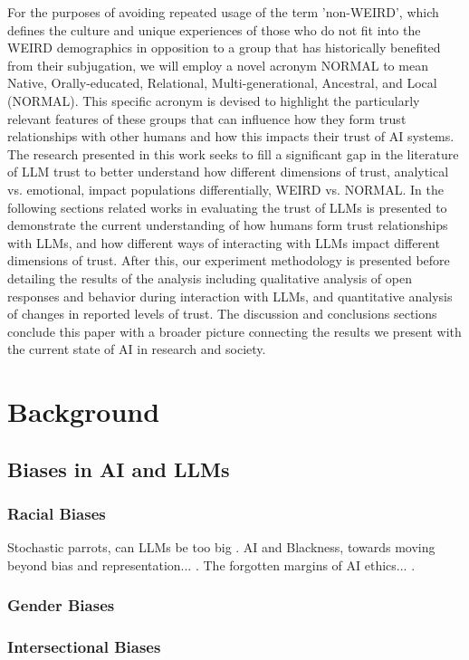 \documentclass[a4paper,fleqn]{cas-sc}
\begin{document}
For the purposes of avoiding repeated usage of the term 'non-WEIRD', which defines the culture and unique experiences of those who do not fit into the WEIRD demographics in opposition to a group that has historically benefited from their subjugation, we will employ a novel acronym NORMAL to mean Native, Orally-educated, Relational, Multi-generational, Ancestral, and Local (NORMAL). This specific acronym is devised to highlight the particularly relevant features of these groups that can influence how they form trust relationships with other humans and how this impacts their trust of AI systems. The research presented in this work seeks to fill a significant gap in the literature of LLM trust to better understand how different dimensions of trust, analytical vs. emotional, impact populations differentially, WEIRD vs. NORMAL. In the following sections related works in evaluating the trust of LLMs is presented to demonstrate the current understanding of how humans form trust relationships with LLMs, and how different ways of interacting with LLMs impact different dimensions of trust. After this, our experiment methodology is presented before detailing the results of the analysis including qualitative analysis of open responses and behavior during interaction with LLMs, and quantitative analysis of changes in reported levels of trust. The discussion and conclusions sections conclude this paper with a broader picture connecting the results we present with the current state of AI in research and society. 

\section{Background}
\subsection{Biases in AI and LLMs}
\subsubsection{Racial Biases}
\cite{buolamwini2018gender} Stochastic parrots, can LLMs be too big \cite{bender2021dangers}. AI and Blackness, towards moving beyond bias and representation... \cite{dancy2021ai}. The forgotten margins of AI ethics... \cite{birhane2022forgotten}. 
\iffalse
\subsubsection{Gender Biases}
\subsubsection{Intersectional Biases}
\end{document}
